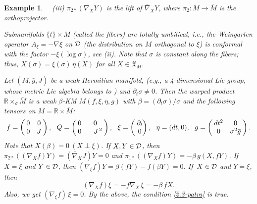 \documentclass[11pt,a4paper,twoside]{article}
\newtheorem{example}{Example}%
\begin{document}
{\begin{example}
\noindent\ \
(iii) $\pi_{2*}(\nabla_XY)$ is the lift of $\bar\nabla_XY$, where $\pi_2: M \to\bar M$ is the orthoprojector.

\smallskip\noindent
Submanifolds $\{t\}\times\bar M$ (called the \textit{fibers}) are totally umbilical, i.e., the Weingarten operator $A_\xi=-\nabla\xi$ on ${\cal D}$
(the distribution on $M$ orthogonal to $\xi$) is conformal with the factor $-\xi(\log\sigma)$, see (ii).
Note that $\sigma$ is constant along the fibers; thus, $X(\sigma)=\xi(\sigma)\,\eta(X)$ for all $X\in\mathfrak{X}_M$.

Let $(\bar M,\bar g, J)$ be a weak Hermitian manifold,
(e.g., a 4-dimensio\-nal Lie group, whose metric Lie algebra belongs to \cite[Table~4]{H-2022})
and $\partial_t\sigma\ne0$.
Then the warped product $\mathbb{R}\times_\sigma\bar M$ is a weak $\beta$-KM $M(f,\xi,\eta,g)$
with $\beta = (\partial_t\sigma)/\sigma$ and the following tensors on $M=\mathbb{R}\times\bar M$:
\begin{equation*}%
 {f} = \left(\hskip-1mm
             \begin{array}{cc}
               0 & 0 \\
               0 & J \\
             \end{array}
           \hskip-1mm\right),\ \
%
 Q = \left(\hskip-1mm
             \begin{array}{cc}
               0 & 0 \\
               0 & - J^{\,2}
\\
             \end{array}
           \hskip-1mm\right),\ \
%
           \xi = \left(\hskip-1mm
            \begin{array}{c}
               \partial_t  \\
               0 \\
             \end{array}
           \hskip-2mm\right),\ \
%
        \eta = (dt, 0) ,\ \
%
           g = \left(\hskip-1mm
             \begin{array}{cc}
              dt^2 & 0 \\
               0 &
\sigma^2\bar g \\
             \end{array}
           \hskip-1mm\right).
\end{equation*}
Note that $X(\beta)=0\ (X\perp\xi)$.
 If $X,Y\in{\cal D}$, then
 $\pi_{2*}((\nabla_X{f})Y) =(\bar\nabla_X J)Y=0$
 and
%
 $\pi_{1*}((\nabla_X{f})Y) =-\beta\,g(X,{f} Y)$.
If~$X=\xi$ and $Y\in{\cal D}$, then
$(\nabla_\xi{f})Y=\beta({f} Y)-{f}(\beta Y)=0$.
If~$X\in{\cal D}$ and $Y=\xi$, then
\[
 (\nabla_X{f})\xi=-{f}\nabla_X\,\xi=-\beta\,{f} X.
\]
Also, we get $(\nabla_\xi{f})\,\xi=0$. By the above, the condition \eqref{2.3-patra} is true.
%
\end{example}

}
\end{document}

